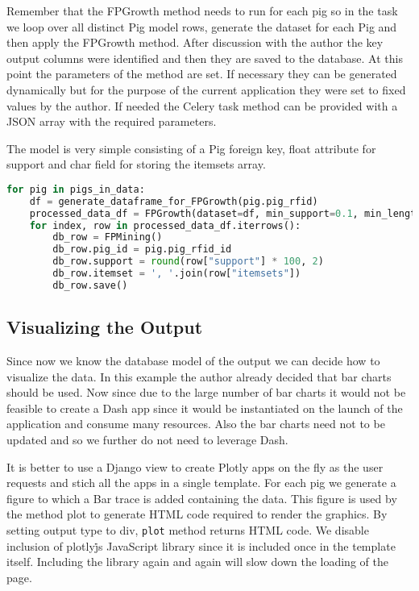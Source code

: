 Remember that the FPGrowth method needs to run for each pig so in the task we loop over all distinct Pig model rows,
generate the dataset for each Pig and then apply the FPGrowth method. After discussion with the author the key output columns
were identified and then they are saved to the database. At this point the parameters of the method are set. If necessary they can
be generated dynamically but for the purpose of the current application they were set to fixed values by the author. If needed the
Celery task method can be provided with a JSON array with the required parameters.

The model is very simple consisting of a Pig foreign key, float attribute for support and char field for storing the itemsets array.

\begin{lstlisting}[language={Python}]
for pig in pigs_in_data:
	df = generate_dataframe_for_FPGrowth(pig.pig_rfid)
	processed_data_df = FPGrowth(dataset=df, min_support=0.1, min_length=3, min_support_of_custom_itemsets=0.1)
	for index, row in processed_data_df.iterrows():
		db_row = FPMining()
		db_row.pig_id = pig.pig_rfid_id
		db_row.support = round(row["support"] * 100, 2)
		db_row.itemset = ', '.join(row["itemsets"])
		db_row.save()
\end{lstlisting}

\subsection{Visualizing the Output}
Since now we know the database model of the output we can decide how to visualize the data. In this example
the author already decided that bar charts should be used. Now since due to the large number of bar charts it would not be feasible
to create a Dash app since it would be instantiated on the launch of the application and consume many resources. Also the bar
charts need not to be updated and so we further do not need to leverage Dash.

It is better to use a Django view to create Plotly apps on the fly as the user requests and stich all the apps in a single
template. For each pig we generate a figure to which a Bar trace is added containing the data. This figure is used by the method
plot to generate HTML code required to render the graphics. By setting output type to div, \texttt{plot} method returns HTML
code. We disable inclusion of plotly\.js JavaScript library since it is included
once in the template itself. Including the library again and again will slow down the loading of the page. 

